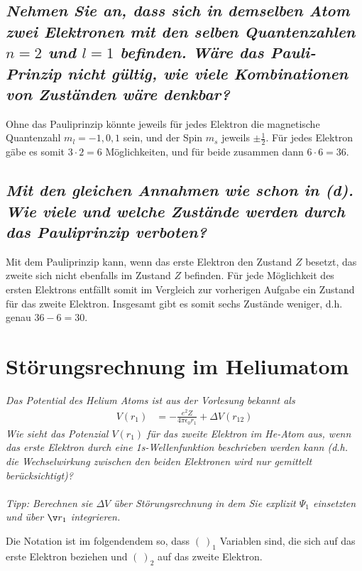 \documentclass[ex, minted]{exercise_4.0}
\begin{document}
\subsection{\it Nehmen Sie an, dass sich in demselben Atom zwei Elektronen mit den selben Quantenzahlen \(n=2\) und \(l=1\) befinden. Wäre das Pauli-Prinzip nicht gültig, wie viele Kombinationen von Zuständen wäre denkbar?}

\dottedlinett

Ohne das Pauliprinzip könnte jeweils für jedes Elektron die magnetische Quantenzahl \(m_l=-1,0,1\) sein, und der Spin \(m_s\) jeweils \(\pm \frac12\). Für jedes Elektron gäbe es somit \(3\cdot2=6\) Möglichkeiten, und für beide zusammen dann \(6\cdot 6 = 36\). 


\subsection{\it Mit den gleichen Annahmen wie schon in (d). Wie viele und welche Zustände werden durch das Pauliprinzip verboten?}

\dottedlinett

Mit dem Pauliprinzip kann, wenn das erste Elektron den Zustand \(Z\) besetzt, das zweite sich nicht ebenfalls im Zustand \(Z\) befinden. Für jede Möglichkeit des ersten Elektrons entfällt somit im Vergleich zur vorherigen Aufgabe ein Zustand für das zweite Elektron. Insgesamt gibt es somit sechs Zustände weniger, d.h. genau \(36-6=30\).  

\section{Störungsrechnung im Heliumatom}
{\it 
    Das Potential des Helium Atoms ist aus der Vorlesung bekannt als
    \begin{align*}
        V(r_1) &= -\frac{e^2 Z}{4\pi \epsilon_0 r_1} + \Delta V(r_{12})
    \end{align*}
    Wie sieht das Potenzial \(V(r_1)\) für das zweite Elektron im He-Atom aus, wenn das erste Elektron durch eine 1s-Wellenfunktion beschrieben werden kann (d.h. die Wechselwirkung zwischen den beiden Elektronen wird nur gemittelt berücksichtigt)?\\\\
    Tipp: Berechnen sie \(\Delta V\) über Störungsrechnung in dem Sie explizit \(\Psi_1\) einsetzten und über \(\v r_1\) integrieren.
}

\dottedlinett

Die Notation ist im folgendendem so, dass \((\ )_1\) Variablen sind, die sich auf das erste Elektron beziehen und \((\ )_2\) auf das zweite Elektron. \\
\end{document}
